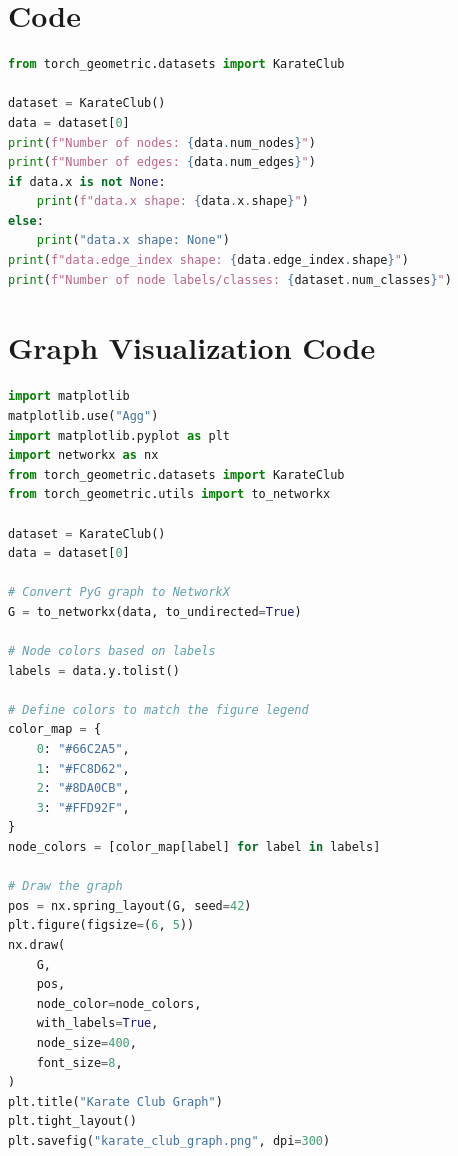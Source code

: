 \documentclass{article}
\begin{document}
\section{Code}
\begin{lstlisting}[language=Python,caption={Part A code}]
from torch_geometric.datasets import KarateClub

dataset = KarateClub()
data = dataset[0]
print(f"Number of nodes: {data.num_nodes}")
print(f"Number of edges: {data.num_edges}")
if data.x is not None:
    print(f"data.x shape: {data.x.shape}")
else:
    print("data.x shape: None")
print(f"data.edge_index shape: {data.edge_index.shape}")
print(f"Number of node labels/classes: {dataset.num_classes}")
\end{lstlisting}

\section{Graph Visualization Code}
\begin{lstlisting}[language=Python,caption={Part A graph visualization}]
import matplotlib
matplotlib.use("Agg")
import matplotlib.pyplot as plt
import networkx as nx
from torch_geometric.datasets import KarateClub
from torch_geometric.utils import to_networkx

dataset = KarateClub()
data = dataset[0]

# Convert PyG graph to NetworkX
G = to_networkx(data, to_undirected=True)

# Node colors based on labels
labels = data.y.tolist()

# Define colors to match the figure legend
color_map = {
    0: "#66C2A5",
    1: "#FC8D62",
    2: "#8DA0CB",
    3: "#FFD92F",
}
node_colors = [color_map[label] for label in labels]

# Draw the graph
pos = nx.spring_layout(G, seed=42)
plt.figure(figsize=(6, 5))
nx.draw(
    G,
    pos,
    node_color=node_colors,
    with_labels=True,
    node_size=400,
    font_size=8,
)
plt.title("Karate Club Graph")
plt.tight_layout()
plt.savefig("karate_club_graph.png", dpi=300)
\end{lstlisting}
\end{document}
